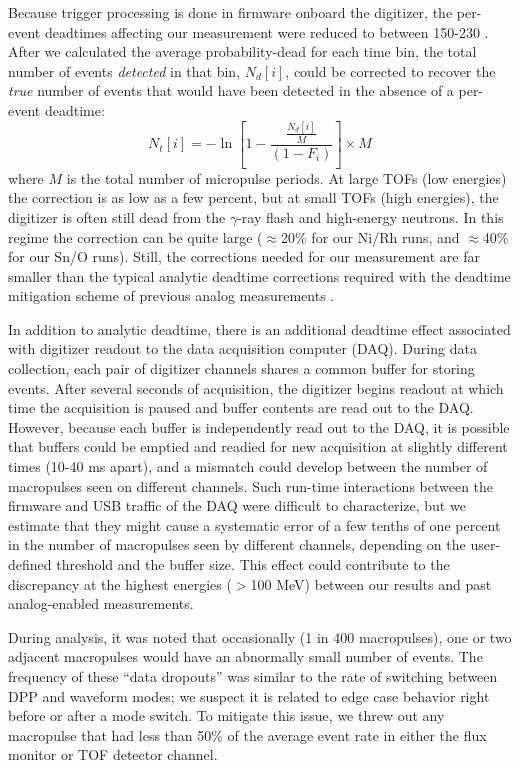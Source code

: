 \documentclass[twocolumn,secnumarabic,amssymb, nobibnotes, aps, prl,
superscriptaddress, nobalancelastpage, floatfix]{revtex4}
\begin{document}
Because trigger processing is done in firmware onboard the digitizer,
the per-event deadtimes affecting our
measurement were reduced to between 150-230 \nano\second.
After we calculated the average probability-dead for each time bin,
the total number of events \textit{detected} in that bin, $N_{d}[i]$, could be
corrected to recover the \textit{true} number of events that would have been
detected in the absence of a per-event deadtime:
\begin{equation}
    N_{t}[i] = -\ln\left[1-\frac{\frac{N_{d}[i]}{M}}{(1-F_{i})}\right]\times M
\end{equation}
where $M$ is the total number of micropulse periods. At large TOFs (low energies) 
the correction is as low as a few percent,
but at small TOFs (high energies), the digitizer is often still dead
from the $\gamma$-ray flash and high-energy neutrons. In this regime
the correction can be quite large ($\approx$20\% for our Ni/Rh runs,
and $\approx$40\% for our Sn/O runs). Still, the corrections needed for our measurement
are far smaller than the typical analytic deadtime corrections required
with the deadtime mitigation scheme of previous analog measurements \cite{Finlay1993,
Abfalterer2001}.

In addition to analytic deadtime, there is an additional deadtime effect associated with 
digitizer readout to the data acquisition computer (DAQ). During data
collection, each pair of digitizer channels shares a common buffer for storing events.
After several seconds of acquisition, the digitizer begins readout at which time the
acquisition is paused and buffer contents are read out to the DAQ. However,
because each buffer is independently read out to the DAQ, it is possible that buffers
could be emptied and readied for new acquisition at slightly different times
(10-40 ms apart), and a mismatch could develop between the number of macropulses
seen on different channels. Such run-time interactions between the firmware and USB
traffic of the DAQ were difficult to characterize, but we estimate that they might cause a 
systematic error of a few tenths of one percent in the number of macropulses seen
by different channels, depending on the user-defined 
threshold and the buffer size. This effect could contribute to the discrepancy at the
highest energies ($>$100 MeV) between our results and past analog-enabled
measurements.

During analysis, it was noted that occasionally (1 in 400 macropulses), one or two 
adjacent macropulses would have an abnormally small number of events. The frequency
of these ``data dropouts'' was similar to the rate of
switching between DPP and waveform modes; we suspect it is related to edge
case behavior right before or after a mode switch. To mitigate this issue,
we threw out any macropulse that had less than 50\% of the average event rate in either the
flux monitor or TOF detector channel.
\end{document}
